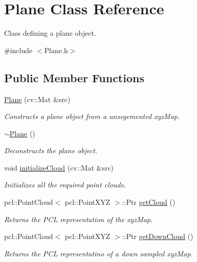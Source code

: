 \hypertarget{class_plane}{}\section{Plane Class Reference}
\label{class_plane}


Class defining a plane object.  




{\ttfamily \#include $<$Plane.\+h$>$}

\subsection*{Public Member Functions}
\begin{DoxyCompactItemize}
\item 
\hyperlink{class_plane_a94bc1ca29c305edb76676528b1a9465c}{Plane} (cv\+::\+Mat \&src)
\begin{DoxyCompactList}\small\item\em Constructs a plane object from a unsegemented xyz\+Map. \end{DoxyCompactList}\item 
\hyperlink{class_plane_a69abd86051c880dcb44b249ad10c4436}{$\sim$\+Plane} ()
\begin{DoxyCompactList}\small\item\em Deconstructs the plane object. \end{DoxyCompactList}\item 
void \hyperlink{class_plane_ab884c9687d63290912707f749adad115}{initialize\+Cloud} (cv\+::\+Mat \&src)
\begin{DoxyCompactList}\small\item\em Initializes all the required point clouds. \end{DoxyCompactList}\item 
pcl\+::\+Point\+Cloud$<$ pcl\+::\+Point\+X\+YZ $>$\+::Ptr \hyperlink{class_plane_a89c277f419ffb0e9d53f29127109465b}{get\+Cloud} ()
\begin{DoxyCompactList}\small\item\em Returns the P\+CL representation of the xyz\+Map. \end{DoxyCompactList}\item 
pcl\+::\+Point\+Cloud$<$ pcl\+::\+Point\+X\+YZ $>$\+::Ptr \hyperlink{class_plane_abad6f7c26005ad7ab847af5acaad9c31}{get\+Down\+Cloud} ()
\begin{DoxyCompactList}\small\item\em Returns the P\+CL representatino of a down sampled xyz\+Map. \end{DoxyCompactList}\item 

\end{DoxyCompactItemize}
